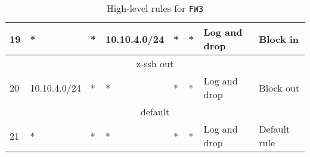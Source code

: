 \documentclass[a4paper, 11pt, oneside]{article}
\begin{document}
\begin{table}[H]
{\begin{tabular}{|llllllll|}
\multicolumn{1}{|l|}{19}          & \multicolumn{1}{l|}{*}                                                            & \multicolumn{1}{l|}{*}                                                              & \multicolumn{1}{l|}{10.10.4.0/24}                                                      & \multicolumn{1}{l|}{*}                                                                   & \multicolumn{1}{l|}{*}                 & \multicolumn{1}{l|}{Log and drop}    & Block in                               \\ \hline
\multicolumn{8}{|c|}{{\color[HTML]{FE0000} z-ssh out}}                                                                                                                                                                                                                                                                                                                                                                                                                                                                   \\ \hline
\multicolumn{1}{|l|}{20}          & \multicolumn{1}{l|}{10.10.4.0/24}                                                 & \multicolumn{1}{l|}{*}                                                              & \multicolumn{1}{l|}{*}                                                                 & \multicolumn{1}{l|}{*}                                                                   & \multicolumn{1}{l|}{*}                 & \multicolumn{1}{l|}{Log and drop}    & Block out                              \\ \hline
\multicolumn{8}{|c|}{{\color[HTML]{FE0000} default}}                                                                                                                                                                                                                                                                                                                                                                                                                                                                     \\ \hline
\multicolumn{1}{|l|}{21}          & \multicolumn{1}{l|}{*}                                                            & \multicolumn{1}{l|}{*}                                                              & \multicolumn{1}{l|}{*}                                                                 & \multicolumn{1}{l|}{*}                                                                   & \multicolumn{1}{l|}{*}                 & \multicolumn{1}{l|}{Log and drop}    & Default rule                           \\ \hline
\end{tabular}
}
\caption{High-level rules for \texttt{FW3}}
\end{table}

\end{document}
